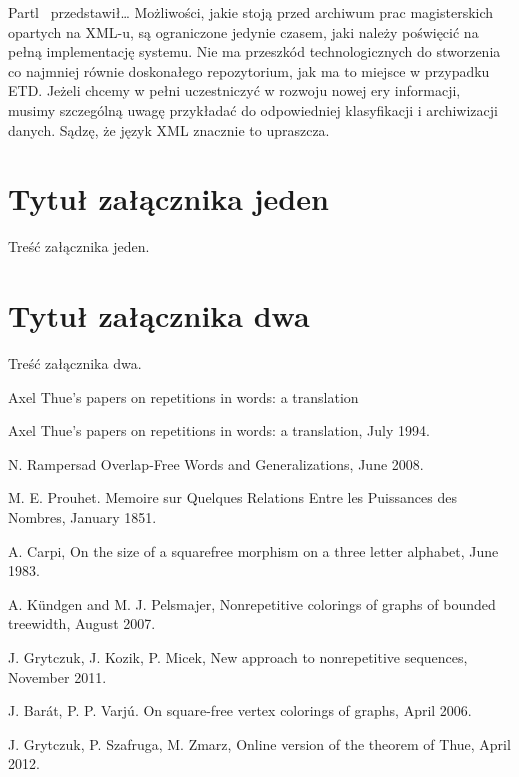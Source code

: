 \documentclass[document]{xmgr}
\begin{document}
\summary
Partl~\cite{pa} przedstawi\l \ldots
Możliwości, jakie stoją przed archiwum prac magisterskich opartych na
XML-u, są ograniczone jedynie czasem, jaki należy poświęcić na pełną
implementację systemu. Nie ma przeszkód technologicznych do stworzenia
co najmniej równie doskonałego repozytorium, jak ma to miejsce w
przypadku ETD. Jeżeli chcemy w pełni uczestniczyć w rozwoju nowej ery
informacji, musimy szczególną uwagę przykładać do odpowiedniej
klasyfikacji i archiwizacji danych. Sądzę, że język XML znacznie to
upraszcza.

\appendix
\chapter{Tytuł załącznika jeden}

Treść załącznika jeden.

\chapter{Tytuł załącznika dwa}

Treść załącznika dwa.


Axel Thue's papers on repetitions in words:
a translation
\begin{thebibliography}{99}

 Axel Thue's papers on repetitions in words: a translation, July 1994.

 N. Rampersad Overlap-Free Words and Generalizations, June 2008.

 M. E. Prouhet. Memoire sur Quelques Relations Entre les Puissances des Nombres, January 1851.

 A. Carpi, On the size of a squarefree morphism on a three letter alphabet, June 1983.

 A. Kündgen and M. J. Pelsmajer, Nonrepetitive colorings of graphs of bounded treewidth, August 2007.

 J. Grytczuk, J. Kozik, P. Micek, New approach to nonrepetitive sequences, November 2011.

 J. Barát, P. P. Varjú. On square-free vertex colorings of graphs, April 2006.

 J. Grytczuk, P. Szafruga, M. Zmarz, Online version of the theorem of Thue, April 2012.

\end{thebibliography}

\listoftables

\listoffigures

\oswiadczenie
\end{document}
